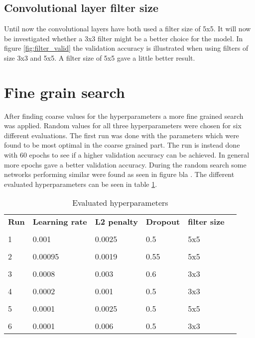 
\FloatBarrier
\subsection{Convolutional layer filter size}
Until now the convolutional layers have both used a filter size of 5x5. It will now be investigated whether a 3x3 filter might be a better choice for the model. In figure \ref{fig:filter_valid} the validation accuracy is illustrated when using filters of size 3x3 and 5x5. A filter size of 5x5 gave a little better result.



\section{Fine grain search}
After finding coarse values for the hyperparameters a more fine grained search was applied. Random values for all three hyperparameters were chosen for six different evaluations. The first run was done with the parameters which were found to be most optimal in the coarse grained part. The run is instead done with 60 epochs to see if a higher validation accuracy can be achieved. In general more epochs gave a better validation accuracy. During the random search some networks performing similar were found as seen in figure bla . The different evaluated hyperparameters can be seen in table \ref{tbl:parameters}.


\begin{table}[htbp]
	\begin{center}
	\begin{tabular}{l  l l l l l }
	\textbf{Run} &  \textbf{Learning rate} & \textbf{L2 penalty} &  	\textbf{Dropout} & \textbf{filter size} & \\
		\\
		1 & 0.001 & 0.0025 & 0.5 & 5x5 \\\hline
		\\
		2 & 0.00095 & 0.0019 & 0.55 & 5x5 \\\hline
		\\
		3 & 0.0008 & 0.003 & 0.6 & 3x3 \\\hline
		\\
		4 & 0.0002 & 0.001 & 0.5 & 3x3 \\\hline
		\\
		5 & 0.0001 & 0.0025 & 0.5 & 5x5 \\\hline
		\\
		6 & 0.0001 & 0.006 & 0.5 & 3x3 \\\hline
	\end{tabular}
	\caption{Evaluated hyperparameters}
	\label{tbl:parameters}
	\end{center}
\end{table}


